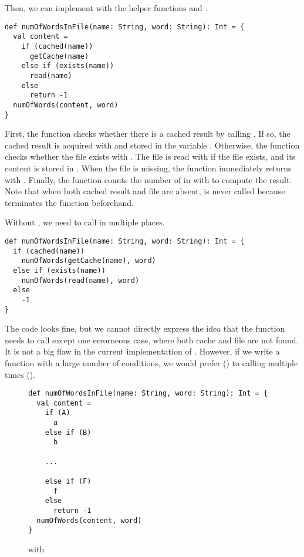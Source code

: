 Then, we can implement  with the helper functions and
.

\begin{verbatim}
def numOfWordsInFile(name: String, word: String): Int = {
  val content =
    if (cached(name))
      getCache(name)
    else if (exists(name))
      read(name)
    else
      return -1
  numOfWords(content, word)
}
\end{verbatim}

First, the function checks whether there is a cached result by calling .
If so, the cached result is acquired with  and stored in the variable
. Otherwise, the function checks whether the file exists with
. The file is read with  if the file exists, and its
content is stored in . When the file is missing, the function
immediately returns  with . Finally, the function
counts the number of  in  with  to
compute the result. Note that when both cached result and file are absent,
 is never called because  terminates the
function beforehand.

Without , we need to call  in multiple places.

\begin{verbatim}
def numOfWordsInFile(name: String, word: String): Int = {
  if (cached(name))
    numOfWords(getCache(name), word)
  else if (exists(name))
    numOfWords(read(name), word)
  else
    -1
}
\end{verbatim}

The code looks fine, but we cannot directly express the idea that the function needs to
call  except one errorneous case, where both cache and file are
not found. It is not a big flaw in the current implementation of
.
However, if we write a function with a large number of conditions, we would
prefer  () to calling  multiple
times ().

\begin{figure}[t]
\begin{verbatim}
def numOfWordsInFile(name: String, word: String): Int = {
  val content =
    if (A)
      a
    else if (B)
      b

    ...

    else if (F)
      f
    else
      return -1
  numOfWords(content, word)
}
\end{verbatim}
\caption{ with }
\end{figure}

